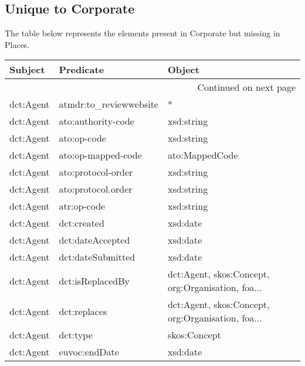 \documentclass[10pt,a4paper,titlepage,final]{article}
\begin{document}
\subsection{Unique to Corporate}
The table below represents the elements present in Corporate but missing in Places.
\begin{longtable}{lll}
\toprule
             Subject &               Predicate &                                             Object \\
\midrule
\endhead
\midrule
\multicolumn{3}{r}{{Continued on next page}} \\
\midrule
\endfoot

\bottomrule
\endlastfoot
           dct:Agent &  atmdr:to\_reviewwebsite &                                                  * \\
           dct:Agent &      ato:authority-code &                                         xsd:string \\
           dct:Agent &             ato:op-code &                                         xsd:string \\
           dct:Agent &      ato:op-mapped-code &                                     ato:MappedCode \\
           dct:Agent &      ato:protocol-order &                                         xsd:string \\
           dct:Agent &      ato:protocol.order &                                         xsd:string \\
           dct:Agent &             atr:op-code &                                         xsd:string \\
           dct:Agent &             dct:created &                                           xsd:date \\
           dct:Agent &        dct:dateAccepted &                                           xsd:date \\
           dct:Agent &       dct:dateSubmitted &                                           xsd:date \\
           dct:Agent &        dct:isReplacedBy &  dct:Agent, skos:Concept, org:Organisation, foa... \\
           dct:Agent &            dct:replaces &  dct:Agent, skos:Concept, org:Organisation, foa... \\
           dct:Agent &                dct:type &                                       skos:Concept \\
           dct:Agent &           euvoc:endDate &                                           xsd:date \\

\end{longtable}
\end{document}
